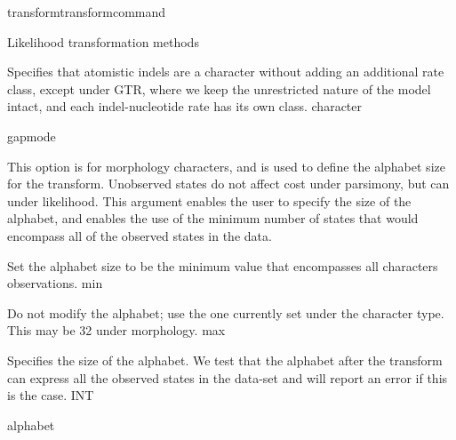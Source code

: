 \begin{command}{transform}{transformcommand}
\begin{arguments}
\begin{argumentgroup}{Likelihood transformation methods}
{\begin{description}
                            {Specifies that atomistic indels are a character
                            without adding an additional rate class, except
                            under GTR, where we keep the unrestricted nature of the
                            model intact, and each indel-nucleotide rate has its
                            own class.}
                            {character}

                    \end{description}}
                {gapmode}

                    {This option is for morphology characters, and is used to
                    define the alphabet size for the transform. Unobserved 
                    states do not affect cost under parsimony, but can under likelihood. 
                    This argument enables the user to specify the size of the alphabet, 
                    and enables the use of the minimum number of states that would 
                    encompass all of the observed states in the data.

                    \begin{description}

                            {Set the alphabet size to be the minimum value that
                            encompasses all characters observations.}
                            {min}

                            {Do not modify the alphabet; use the one currently
                            set under the character type. This may be 32 under
                            morphology.}
                            {max}

                            {Specifies the size of the alphabet. We test that
                            the alphabet after the transform can express all the
                            observed states in the data-set and will report an
                            error if this is the case.}
                            {INT}
                            
                    \end{description}}
                {alphabet}

        \end{argumentgroup}


\end{arguments}
\end{command}
